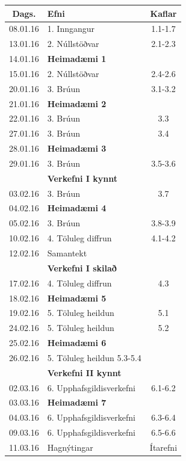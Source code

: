 \documentclass[letterpaper,10pt,icelandic]{sphinxmanual}
\begin{document}
\begin{center}
	\begin{tabular}{c|l|c}
		Dags. &Efni&Kaflar\\
		\hline
		08.01.16 & 1.  Inngangur  &  1.1-1.7\\\hline
		13.01.16 & 2. Núllstöðvar & 2.1-2.3\\
		14.01.16 & \textbf{Heimadæmi 1} & \\
		15.01.16 & 2. Núllstöðvar & 2.4-2.6\\\hline
		20.01.16 & 3. Brúun & 3.1-3.2 \\
		21.01.16 & \textbf{Heimadæmi 2} & \\
		22.01.16 & 3. Brúun & 3.3\\\hline
		27.01.16 & 3. Brúun & 3.4\\
		28.01.16 & \textbf{Heimadæmi 3} & \\
		29.01.16 & 3. Brúun & 3.5-3.6 \\
		& \textbf{Verkefni I kynnt} & \\\hline
		03.02.16 & 3. Brúun & 3.7 \\
		04.02.16 & \textbf{Heimadæmi 4} &\\
		05.02.16 & 3. Brúun & 3.8-3.9\\\hline
		10.02.16 & 4. Töluleg diffrun & 4.1-4.2\\
		12.02.16 & Samantekt & \\	
		& \textbf{Verkefni I skilað}\\\hline
		17.02.16 & 4. Töluleg diffrun & 4.3 \\
		18.02.16 & \textbf{Heimadæmi 5} & \\
		19.02.16 & 5. Töluleg heildun & 5.1\\\hline
		24.02.16 & 5. Töluleg heildun & 5.2\\
		25.02.16 & \textbf{Heimadæmi 6}&\\
		26.02.16 & 5. Töluleg heildun 5.3-5.4& \\
		& \textbf{Verkefni II kynnt} & \\\hline
		02.03.16 & 6. Upphafsgildisverkefni & 6.1-6.2\\
		03.03.16 & \textbf{Heimadæmi 7}&\\
		04.03.16 & 6. Upphafsgildisverkefni & 6.3-6.4\\\hline
		09.03.16 & 6. Upphafsgildisverkefni & 6.5-6.6\\
		11.03.16 & Hagnýtingar & Ítarefni \\

\end{tabular}
\end{center}
\end{document}
